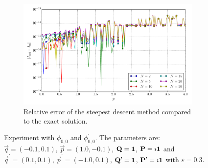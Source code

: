 \documentclass[a4paper,10pt]{article}
\begin{document}
\begin{figure}[ht!]
\begin{subfigure}[t]{0.5\linewidth}
    \includegraphics[width=\linewidth]{./plots/tp_2d_conv_p_(0,0)_(0,0)_err_rel_nsd.pdf}
    \caption{Relative error of the steepest descent method compared to the exact solution.}
    \label{fig:tp_2d_conv_p_00_00_err_rel_nsd}
  \end{subfigure}
  \label{fig:tp_2d_conv_p_00_00}
  \caption{Experiment with $\phi_{0,0}$ and $\phi_{0,0}^{\prime}$.
  The parameters are:
  $\vec{q} = (-0.1,  0.1)$,
  $\vec{p} = ( 1.0, -0.1)$,
  $\mathbf{Q} = \mathbf{1}$,
  $\mathbf{P} = \imath \mathbf{1}$
  and
  $\vec{q}^\prime = ( 0.1, 0.1)$,
  $\vec{p}^\prime = (-1.0, 0.1)$,
  $\mathbf{Q}^\prime = \mathbf{1}$,
  $\mathbf{P}^\prime = \imath \mathbf{1}$
  with $\varepsilon=0.3$.}
\end{figure}
\end{document}
